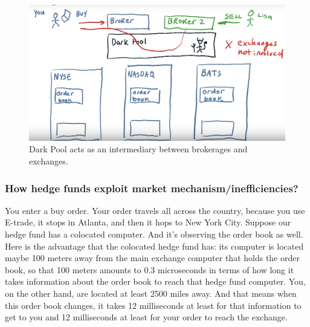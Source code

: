 \documentclass[12pt]{article}
\begin{document}
\begin{figure}[!ht]
\centering
\includegraphics[scale=0.3]{fig/fig30}
\caption{Dark Pool acts as an intermediary between brokerages and exchanges.}
\end{figure}

\subsubsection{How hedge funds exploit market mechanism/inefficiencies?}

\noindent
You enter a buy order. Your order travels all across the country, because you use E-trade, it stops in Atlanta, and then it hops to New York City. Suppose our hedge fund has a colocated computer. And it's observing the order book as well. Here is the advantage that the colocated hedge fund has: its computer is located maybe 100 meters away from the main exchange computer that holds the order book, so that 100 meters amounts to 0.3 microseconds in terms of how long it takes information about the order book to reach that hedge fund computer. You, on the other hand, are located at least 2500 miles away. And that means when this order book changes, it takes 12 milliseconds at least for that information to get to you and 12 milliseconds at least for your order to reach the exchange. 
\end{document}
